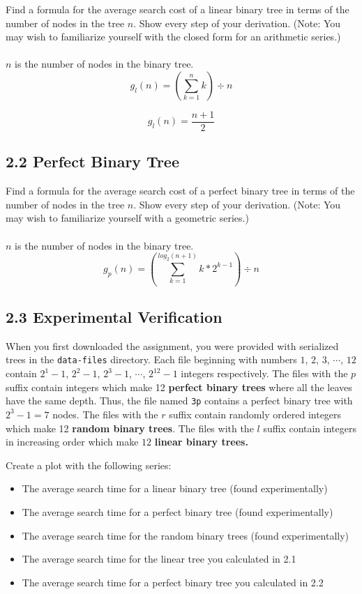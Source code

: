 \documentclass{article}
\begin{document}
Find a formula for the average search cost of a linear binary tree in terms of the number of nodes in the tree $n$. Show every step of your derivation. (Note: You may wish to familiarize yourself with the closed form for an arithmetic series.)
\\
\\
$n$ is the number of nodes in the binary tree.
\begin{equation}
    g_l(n) = (\sum_{k=1}^{n} k) \div n
\end{equation}

\begin{equation}
    g_l(n) = \frac{n + 1}{2}
\end{equation}

\subsection*{2.2 Perfect Binary Tree}

Find a formula for the average search cost of a perfect binary tree in terms of the number of nodes in the tree $n$. Show every step of your derivation. (Note: You may wish to familiarize yourself with a geometric series.)
\\
\\
$n$ is the number of nodes in the binary tree.
\begin{equation}
    g_p(n) = (\sum_{k=1}^{log_{2}(n + 1)} k * 2^{k - 1}) \div n
\end{equation}

\subsection*{2.3 Experimental Verification}

When you first downloaded the assignment, you were provided with serialized trees in the \verb|data-files| directory. Each file beginning with numbers $1$, $2$, $3$, $\cdots$, $12$ contain $2^1 - 1$, $2^2 -1$, $2^3 - 1$, $\cdots$, $2^{12} - 1$ integers respectively. The files with the $p$ suffix contain integers which make 12 \textbf{perfect binary trees} where all the leaves have the same depth. Thus, the file named \verb|3p| contains a perfect binary tree with $2^{3} - 1 = 7$ nodes. The files with the $r$ suffix contain randomly ordered integers which make 12 \textbf{random binary trees}. The files with the $l$ suffix contain integers in increasing order which make $12$ \textbf{linear binary trees.} 

\bigskip
\noindent Create a plot with the following series:
\begin{itemize}
    \item The average search time for a linear binary tree (found experimentally)
    \item The average search time for a perfect binary tree (found experimentally)
    \item The average search time for the random binary trees (found experimentally)
    \item The average search time for the linear tree you calculated in 2.1
    \item The average search time for a perfect binary tree you calculated in 2.2
\end{itemize}
\end{document}
